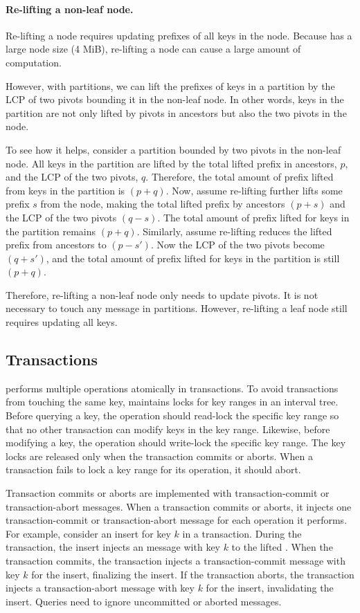 \paragraph{Re-lifting a non-leaf node.}
Re-lifting a node requires updating prefixes of all keys in the node.
Because \fti has a large node size (4 MiB),
re-lifting a node can cause a large amount of computation.

However, with partitions, we can lift the prefixes of keys in a partition by the
LCP of two pivots bounding it in the non-leaf node.
In other words, keys in the partition are not only lifted by pivots in ancestors
but also the two pivots in the node.

To see how it helps, consider a partition bounded by two pivots in the non-leaf
node.
All keys in the partition are lifted by the total lifted prefix in ancestors, $p$,
and the LCP of the two pivots, $q$.
Therefore, the total amount of prefix lifted from keys in the partition is $(p+q)$.
Now, assume re-lifting further lifts some prefix $s$ from the node,
making the total lifted prefix by ancestors $(p+s)$
and the LCP of the two pivots $(q-s)$.
The total amount of prefix lifted for keys in the partition remains $(p+q)$.
Similarly, assume re-lifting reduces the lifted prefix from ancestors to
$(p-s')$.
Now the LCP of the two pivots become $(q+s')$, and the total amount of prefix
lifted for keys in the partition is still $(p+q)$.

Therefore, re-lifting a non-leaf node only needs to update pivots.
It is not necessary to touch any message in partitions.
However, re-lifting a leaf node still requires updating all keys.

\subsection{Transactions}

\Fti performs multiple operations atomically in transactions.
To avoid transactions from touching the same key, \fti maintains locks for key
ranges in an interval tree.
Before querying a key, the operation should read-lock the specific key range so
that no other transaction can modify keys in the key range.
Likewise, before modifying a key, the operation should write-lock the specific
key range.
The key locks are released only when the transaction commits or aborts.
When a transaction fails to lock a key range for its operation, it should
abort.

Transaction commits or aborts are implemented with transaction-commit or
transaction-abort messages.
When a transaction commits or aborts, it injects one transaction-commit or
transaction-abort message for each operation it performs.
For example, consider an insert for key $k$ in a transaction.
During the transaction, the insert injects an \putm message with key $k$
to the lifted \bet.
When the transaction commits, the transaction injects a transaction-commit
message with key $k$ for the insert, finalizing the insert.
If the transaction aborts, the transaction injects a transaction-abort message
with key $k$ for the insert, invalidating the insert.
Queries need to ignore uncommitted or aborted messages.

